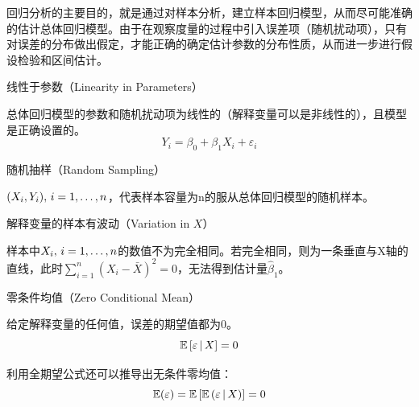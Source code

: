 \documentclass[11pt]{article}
\begin{document}
回归分析的主要目的，就是通过对样本分析，建立样本回归模型，从而尽可能准确的估计总体回归模型。由于在观察度量的过程中引入误差项（随机扰动项），只有对误差的分布做出假定，才能正确的确定估计参数的分布性质，从而进一步进行假设检验和区间估计。

\begin{assumption}
    线性于参数（Linearity in Parameters）

    总体回归模型的参数和随机扰动项为线性的（解释变量可以是非线性的），且模型是正确设置的。
    \begin{equation*}
        Y_i = \beta_0 + \beta_1 X_i + \varepsilon_i
    \end{equation*}

    \label{ols-assumnption-1}
\end{assumption}

\begin{assumption}
    随机抽样（Random Sampling）

    $(X_i,Y_i) ,\, i=1,\dots,n$，代表样本容量为n的服从总体回归模型的随机样本。

    \label{ols-assumnption-2}
\end{assumption}

\begin{assumption}
    解释变量的样本有波动（Variation in $X$）

    样本中$X_i ,\, i=1,\dots,n$的数值不为完全相同。若完全相同，则为一条垂直与X轴的直线，此时$\sum_{i=1}^{n} (X_i - \bar{X})^2 =0$，无法得到估计量$\hat{\beta}_1$。

    \label{ols-assumnption-3}
\end{assumption}

\begin{assumption}
    零条件均值（Zero Conditional Mean）

    给定解释变量的任何值，误差的期望值都为0。
    \begin{equation*}
        \mathbb{E}\left[ \varepsilon \,\vert\, X \right] = 0
    \end{equation*}

    利用全期望公式还可以推导出无条件零均值：
    \begin{equation*}
        \mathbb{E}(\varepsilon) = \mathbb{E}\left[ \mathbb{E} \left( \varepsilon \,\vert\, X \right) \right] = 0
    \end{equation*}

    \label{ols-assumnption-4}
\end{assumption}
\end{document}
